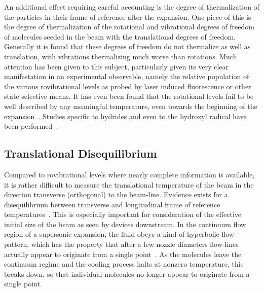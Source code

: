 An additional effect requiring careful accounting is the degree of thermalization of the particles in their frame of reference after the expansion.
One piece of this is the degree of thermalization of the rotational and vibrational degrees of freedom of molecules seeded in the beam with the translational degrees of freedom.
Generally it is found that these degrees of freedom do not thermalize as well as translation, with vibrations thermalizing much worse than rotations.
Much attention has been given to this subject, particularly given its very clear manifestation in an experimental observable, namely the relative population of the various rovibrational levels as probed by laser induced fluorescence or other state selective means.
It has even been found that the rotational levels fail to be well described by any meaningful temperature, even towards the beginning of the expansion~\cite{Hulsman2001}.
Studies specific to hydrides and even to the hydroxyl radical have been performed~\cite{Belikov2001}. 

\subsection{Translational Disequilibrium}\label{transdissec}

Compared to rovibrational levels where nearly complete information is available, it is rather difficult to measure the translational temperature of the beam in the direction transverse (orthogonal) to the beam-line. 
Evidence exists for a disequilibrium between transverse and longitudinal frame of reference temperatures~\cite{beijerinck1981,Toennies1977,Miller1988}.
This is especially important for consideration of the effective initial size of the beam as seen by devices downstream.
In the continuum flow region of a supersonic expansion, the fluid obeys a kind of hyperbolic flow pattern, which has the property that after a few nozzle diameters flow-lines actually appear to originate from a single point~\cite{Miller1988}.
As the molecules leave the continuum regime and the cooling process halts at nonzero temperature, this breaks down, so that individual molecules no longer appear to originate from a single point.

